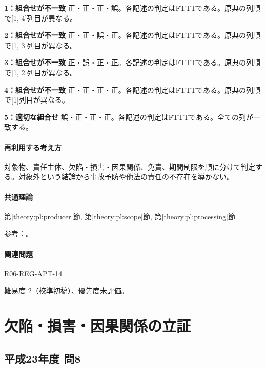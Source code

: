 \noindent\textbf{1：組合せが不一致} 正・正・正・誤。各記述の判定はFTTTである。原典の列順で[1, 4]列目が異なる。\par

\noindent\textbf{2：組合せが不一致} 正・正・誤・正。各記述の判定はFTTTである。原典の列順で[1, 3]列目が異なる。\par

\noindent\textbf{3：組合せが不一致} 正・誤・正・正。各記述の判定はFTTTである。原典の列順で[1, 2]列目が異なる。\par

\noindent\textbf{4：組合せが不一致} 正・正・正・正。各記述の判定はFTTTである。原典の列順で[1]列目が異なる。\par

\noindent\textbf{5：適切な組合せ} 誤・正・正・正。各記述の判定はFTTTである。全ての列が一致する。\par

\paragraph{再利用する考え方} 対象物、責任主体、欠陥・損害・因果関係、免責、期間制限を順に分けて判定する。対象外という結論から事故予防や他法の責任の不存在を導かない。

\paragraph{共通理論} \hyperref[theory:pl:producer]{第\ref*{theory:pl:producer}節}, \hyperref[theory:pl:scope]{第\ref*{theory:pl:scope}節}, \hyperref[theory:pl:processing]{第\ref*{theory:pl:processing}節}

\par 参考：\cite{pl_statute,pl_qa,pl_definitions2018}。

\paragraph{関連問題} \hyperref[q:r06-reg-apt-14]{R06-REG-APT-14}

\par 難易度 2（校準初稿）、優先度未評価。

\section{欠陥・損害・因果関係の立証}

\subsection{平成23年度 問8}
\label{q:h23-reg-apt-08}

